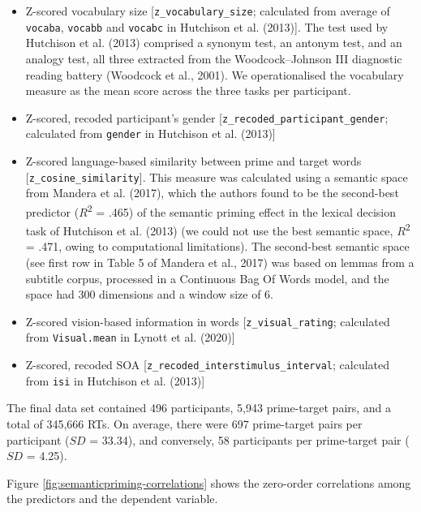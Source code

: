 \documentclass[
  12pt,
  man,floatsintext]{apa7}
\begin{document}
\begin{itemize}
\item
  Z-scored vocabulary size {[}\texttt{z\_vocabulary\_size}; calculated from average of \texttt{vocaba}, \texttt{vocabb} and \texttt{vocabc} in Hutchison et al. (2013){]}. The test used by Hutchison et al. (2013) comprised a synonym test, an antonym test, and an analogy test, all three extracted from the Woodcock--Johnson III diagnostic reading battery (Woodcock et al., 2001). We operationalised the vocabulary measure as the mean score across the three tasks per participant.
\item
  Z-scored, recoded participant's gender {[}\texttt{z\_recoded\_participant\_gender}; calculated from \texttt{gender} in Hutchison et al. (2013){]}
\item
  Z-scored language-based similarity between prime and target words {[}\texttt{z\_cosine\_similarity}{]}. This measure was calculated using a semantic space from Mandera et al. (2017), which the authors found to be the second-best predictor (\(R\)\textsuperscript{2} = .465) of the semantic priming effect in the lexical decision task of Hutchison et al. (2013) (we could not use the best semantic space, \(R\)\textsuperscript{2} = .471, owing to computational limitations). The second-best semantic space (see first row in Table 5 of Mandera et al., 2017) was based on lemmas from a subtitle corpus, processed in a Continuous Bag Of Words model, and the space had 300 dimensions and a window size of 6.
\item
  Z-scored vision-based information in words {[}\texttt{z\_visual\_rating}; calculated from \texttt{Visual.mean} in Lynott et al. (2020){]}
\item
  Z-scored, recoded SOA {[}\texttt{z\_recoded\_interstimulus\_interval}; calculated from \texttt{isi} in Hutchison et al. (2013){]}
\end{itemize}

The final data set contained 496 participants, 5,943 prime-target pairs, and a total of 345,666 RTs. On average, there were 697 prime-target pairs per participant (\(SD\) = 33.34), and conversely, 58 participants per prime-target pair (\(SD\) = 4.25).

Figure \ref{fig:semanticpriming-correlations} shows the zero-order correlations among the predictors and the dependent variable.
\end{document}
